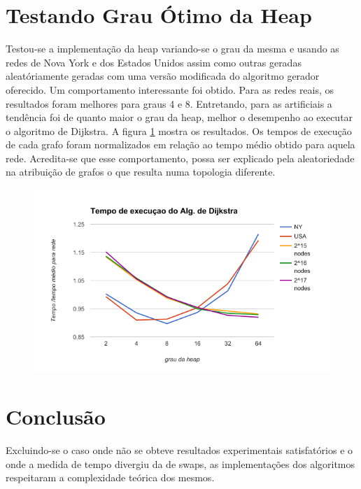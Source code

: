 \documentclass{iiufrgs}
\begin{document}
\section{Testando Grau Ótimo da Heap}
Testou-se a implementaç\~ao da heap variando-se o grau da mesma e usando as redes de Nova York e dos Estados Unidos assim como outras geradas aleatóriamente geradas com uma vers\~ao modificada do algoritmo gerador oferecido. Um comportamento interessante foi obtido. Para as redes reais, os resultados foram melhores para graus 4 e 8. Entretando, para as artificiais a tendência foi de quanto maior o grau da heap, melhor o desempenho ao executar o algoritmo de Dijkstra. A figura \ref{fig:narity} mostra os resultados. Os tempos de execuç\~ao de cada grafo foram normalizados em relaç\~ao ao tempo médio obtido para aquela rede. Acredita-se que esse comportamento, possa ser explicado pela aleatoriedade na atribuiç\~ao de grafos o que resulta numa topologia diferente.
\begin{figure}[h!]
\includegraphics[width=0.75\linewidth]{narity}
\centering
\caption{}{}
\label{fig:narity}
\end{figure}

\section{Conclus\~ao}
Excluindo-se o caso onde n\~ao se obteve resultados experimentais satisfatórios e o onde a medida de tempo divergiu da de swaps, as implementaç\~oes dos algoritmos respeitaram a complexidade teórica dos mesmos.
\end{document}
